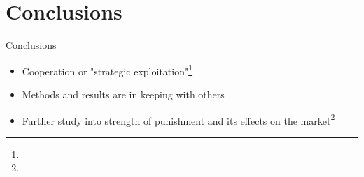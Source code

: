 \documentclass{beamer}
\begin{document}
\section{Conclusions}
\begin{frame}{Conclusions}
\begin{itemize}
    \item Cooperation or "strategic exploitation"\footnote{}
    \item Methods and results are in keeping with others
    \item Further study into strength of punishment and its effects on the market\footnote{}
\end{itemize}
\end{frame}
\end{document}
